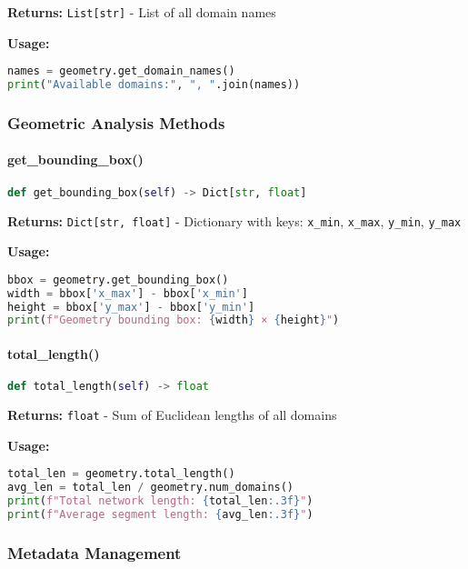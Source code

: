 \textbf{Returns:} \texttt{List[str]} - List of all domain names

\textbf{Usage:}
\begin{lstlisting}[language=Python]
names = geometry.get_domain_names()
print("Available domains:", ", ".join(names))
\end{lstlisting}

\subsubsection{Geometric Analysis Methods}

\paragraph{get\_bounding\_box()}
\begin{lstlisting}[language=Python, caption=Bounding Box Calculation]
def get_bounding_box(self) -> Dict[str, float]
\end{lstlisting}

\textbf{Returns:} \texttt{Dict[str, float]} - Dictionary with keys: \texttt{x\_min}, \texttt{x\_max}, \texttt{y\_min}, \texttt{y\_max}

\textbf{Usage:}
\begin{lstlisting}[language=Python]
bbox = geometry.get_bounding_box()
width = bbox['x_max'] - bbox['x_min']
height = bbox['y_max'] - bbox['y_min']
print(f"Geometry bounding box: {width} × {height}")
\end{lstlisting}

\paragraph{total\_length()}
\begin{lstlisting}[language=Python, caption=Total Length Calculation]
def total_length(self) -> float
\end{lstlisting}

\textbf{Returns:} \texttt{float} - Sum of Euclidean lengths of all domains

\textbf{Usage:}
\begin{lstlisting}[language=Python]
total_len = geometry.total_length()
avg_len = total_len / geometry.num_domains()
print(f"Total network length: {total_len:.3f}")
print(f"Average segment length: {avg_len:.3f}")
\end{lstlisting}

\subsubsection{Metadata Management}

